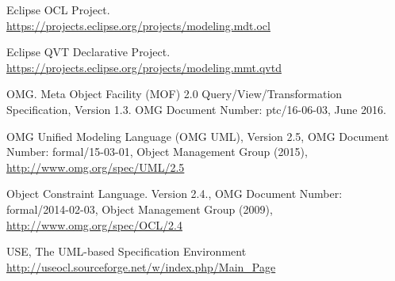 \documentclass{llncs}
\begin{document}
\begin{thebibliography}{}
Eclipse OCL Project.\\
\url{https://projects.eclipse.org/projects/modeling.mdt.ocl}

Eclipse QVT Declarative Project.\\
\url{https://projects.eclipse.org/projects/modeling.mmt.qvtd}

OMG. Meta Object Facility (MOF) 2.0 Query/View/Transformation Specification, Version 1.3.
OMG Document Number: ptc/16-06-03, June 2016.

OMG Unified Modeling Language (OMG UML), Version 2.5, {OMG Document Number}: formal/15-03-01, Object Management Group (2015), \url{http://www.omg.org/spec/UML/2.5}

Object Constraint Language. Version 2.4., OMG Document Number: formal/2014-02-03, Object Management Group (2009),  \url{http://www.omg.org/spec/OCL/2.4}

USE, The UML-based Specification Environment \url{http://useocl.sourceforge.net/w/index.php/Main\_Page}
\end{thebibliography}
\end{document}
